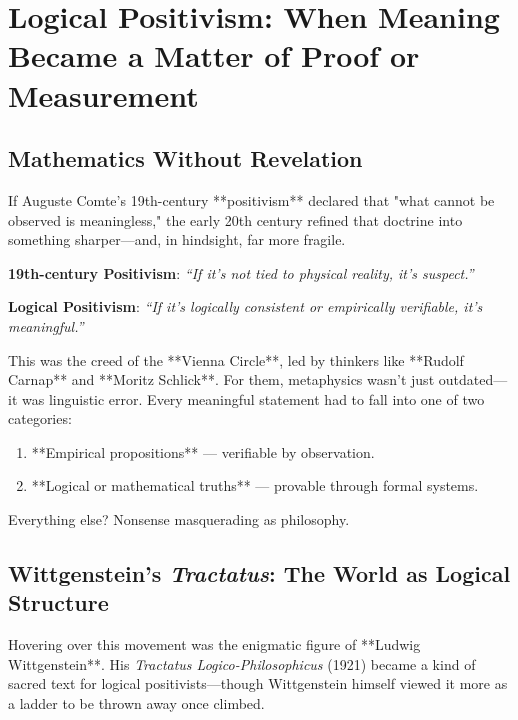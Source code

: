 \section{Logical Positivism: When Meaning Became a Matter of Proof or Measurement}

\subsection{Mathematics Without Revelation}
If Auguste Comte’s 19th-century **positivism** declared that "what cannot be observed is meaningless," the early 20th century refined that doctrine into something sharper—and, in hindsight, far more fragile.

\begin{tcolorbox}[colback=gray!5!white, colframe=black!75!white, title={From Comte to Carnap: The Evolution of Positivism}]
\textbf{19th-century Positivism}:  
\textit{“If it’s not tied to physical reality, it’s suspect.”}

\textbf{Logical Positivism}:  
\textit{“If it’s logically consistent or empirically verifiable, it’s meaningful.”}
\end{tcolorbox}

This was the creed of the **Vienna Circle**, led by thinkers like **Rudolf Carnap** and **Moritz Schlick**. For them, metaphysics wasn’t just outdated—it was linguistic error. Every meaningful statement had to fall into one of two categories:

\begin{enumerate}
    \item **Empirical propositions** — verifiable by observation.
    \item **Logical or mathematical truths** — provable through formal systems.
\end{enumerate}

Everything else? Nonsense masquerading as philosophy.

\subsection{Wittgenstein’s \textit{Tractatus}: The World as Logical Structure}

Hovering over this movement was the enigmatic figure of **Ludwig Wittgenstein**. His \textit{Tractatus Logico-Philosophicus} (1921) became a kind of sacred text for logical positivists—though Wittgenstein himself viewed it more as a ladder to be thrown away once climbed.

